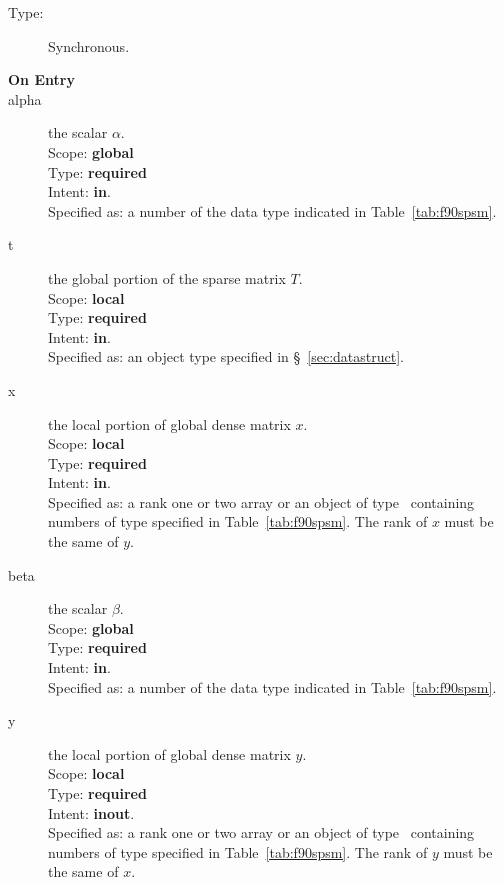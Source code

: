 \begin{description}
\item[Type:] Synchronous.
\item[\bf On Entry]
\item[alpha] the scalar $\alpha$.\\
Scope: {\bf global} \\
Type: {\bf required}\\
Intent: {\bf in}.\\
Specified as: a number of the data type indicated in
Table~\ref{tab:f90spsm}.
\item[t] the global portion of the sparse matrix
$T$.  \\ 
Scope: {\bf local} \\
Type: {\bf required}\\
Intent: {\bf in}.\\
Specified as: an object type specified in
\S~\ref{sec:datastruct}.
\item[x] the local portion of global dense matrix
$x$. %
\\
Scope: {\bf local} \\
Type: {\bf required} \\
Intent: {\bf in}.\\
Specified as:  a rank one or two array or an object of type \vdata\ 
containing numbers of type specified in
Table~\ref{tab:f90spsm}.  The rank of $x$ must be the same of $y$. 
\item[beta] the scalar $\beta$.\\
Scope: {\bf global} \\
Type: {\bf required} \\
Intent: {\bf in}.\\
Specified as: a number of the data type indicated in Table~\ref{tab:f90spsm}.
\item[y] the local portion of global dense matrix
$y$. %
\\
Scope: {\bf local} \\
Type: {\bf required} \\
Intent: {\bf inout}.\\
Specified as:  a rank one or two array or an object of type \vdata\ 
containing numbers of type specified in
Table~\ref{tab:f90spsm}. The rank of $y$ must be the same of $x$. 

\end{description}
